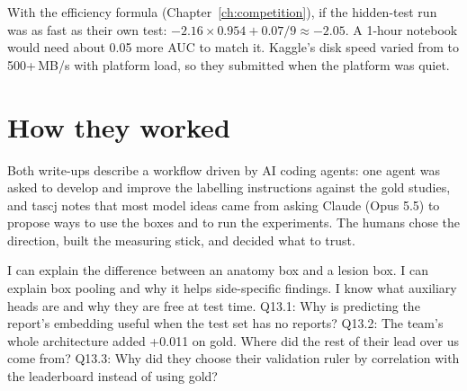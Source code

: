 \begin{innumbers}
With the efficiency formula (Chapter~\ref{ch:competition}), if the hidden-test run was as fast as their own test:
$-2.16 \times 0.954 + 0.07/9 \approx -2.05$. A 1-hour notebook
would need about 0.05 more AUC to match it. Kaggle's disk speed varied from  to 500+\,MB/s with platform load, so
they submitted when the platform was quiet.
\end{innumbers}

\section{How they worked}

Both write-ups describe a workflow driven by AI coding agents: one agent was asked to develop and improve the
labelling instructions against the gold studies, and tascj notes that most model ideas came from asking Claude
(Opus 5.5) to propose ways to use the boxes and to run the experiments. The humans chose the direction, built the
measuring stick, and decided what to trust.

\begin{checkpoint}
\begin{itemize}
\done I can explain the difference between an anatomy box and a lesion box.
\done I can explain box pooling and why it helps side-specific findings.
\done I know what auxiliary heads are and why they are free at test time.
\quiz Q13.1: Why is predicting the report's embedding useful when the test set has no reports?
\quiz Q13.2: The team's whole architecture added +0.011 on gold. Where did the rest of their lead over us come from?
\quiz Q13.3: Why did they choose their validation ruler by correlation with the leaderboard instead of using gold?
\end{itemize}
\end{checkpoint}
